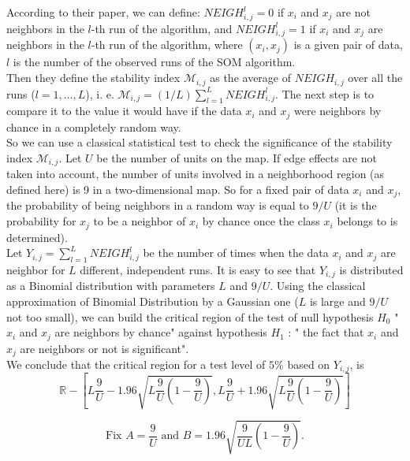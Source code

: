 \documentclass[preprint]{elsarticle}
\begin{document}
According to their paper, we can define:
$NEIGH_{i,j}^l=0$ if $x_i$ and $x_j$ are not neighbors in the $l$-th run of the algorithm, and 
$NEIGH_{i,j}^l=1$ if $x_i$ and $x_j$ are neighbors in the $l$-th run of the algorithm, 
where $(x_i, x_j)$ is a given pair of data, $l$ is the number of the observed runs of the SOM algorithm.\\

Then they define the stability index $\mathcal{M}_{i,j}$ as the average of $NEIGH_{i,j}$ over all the runs ($l=1, \hdots, L$), i. e. 
$\mathcal{M}_{i,j} = (1/L)\sum_{l=1}^L NEIGH_{i,j}^l$. The next step is to compare it to the value it would have if the data $x_i$ and $x_j$ were neighbors by chance in a completely random way.\\

So we can use a classical statistical test to check the significance of the stability index $\mathcal{M}_{i,j}$. Let $U$ be the number of units on the map. If edge effects are not taken into account, the number of units involved in a neighborhood region (as defined here) is 9 in a two-dimensional map. So for a fixed pair of data $x_i$ and $x_j$, the probability of being neighbors in a random way is equal to $9/U$ (it is the probability for $x_j$ to be a neighbor of $x_i$ by chance once the class $x_i$ belongs to is determined).\\

Let $Y_{i,j}= \sum_{l=1}^L NEIGH_{i,j}^l$ be the number of times when the data $x_i$ and $x_j$ are neighbor for $L$ different, independent runs. It is easy to see that $Y_{i,j}$ is distributed as a Binomial distribution with parameters $L$ and $9/U$. Using the classical approximation of Binomial Distribution by a Gaussian one ($L$ is large and $9/U$ not too small), we can build the critical region of the test of null hypothesis $H_0$ "$x_i$ and $x_j$ are neighbors by chance" against hypothesis $H_1$ : " the fact that $x_i$ and $x_j$ are neighbors or not is significant".\\

We conclude that the critical region for a test level of $5\%$ based on $Y_{i,j}$, is 
\begin{equation*} 
\mathbb{R} - [ L \frac{9}{U} - 1.96 \sqrt{L \frac{9}{U} ( 1 - \frac{9}{U})}, L \frac{9}{U} + 1.96 \sqrt{L \frac{9}{U} ( 1 - \frac{9}{U}) } ] 
\end{equation*}
 
\begin{equation}\label{AB}
\text {Fix } A = \frac{9}{U} \text{ and } B = 1.96 \sqrt{\frac{9}{UL} ( 1 - \frac{9}{U})}.
\end{equation}
\end{document}
